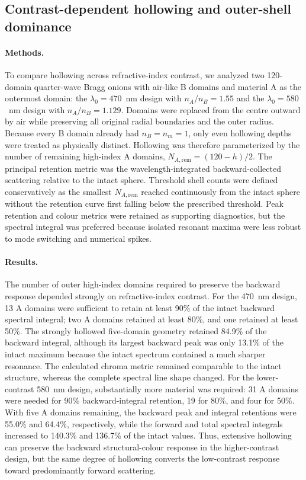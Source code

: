 \subsection{Contrast-dependent hollowing and outer-shell dominance}
\label{sec:hollowing_contrast}

\paragraph{Methods.}
To compare hollowing across refractive-index contrast, we analyzed two 120-domain quarter-wave Bragg onions with air-like B domains and material A as the outermost domain: the $\lambda_0=470$~nm design with $n_A/n_B=1.55$ and the $\lambda_0=580$~nm design with $n_A/n_B=1.129$. Domains were replaced from the centre outward by air while preserving all original radial boundaries and the outer radius. Because every B domain already had $n_B=n_m=1$, only even hollowing depths were treated as physically distinct. Hollowing was therefore parameterized by the number of remaining high-index A domains, $N_{A,\mathrm{rem}}=(120-h)/2$. The principal retention metric was the wavelength-integrated backward-collected scattering relative to the intact sphere. Threshold shell counts were defined conservatively as the smallest $N_{A,\mathrm{rem}}$ reached continuously from the intact sphere without the retention curve first falling below the prescribed threshold. Peak retention and colour metrics were retained as supporting diagnostics, but the spectral integral was preferred because isolated resonant maxima were less robust to mode switching and numerical spikes.

\paragraph{Results.}
The number of outer high-index domains required to preserve the backward response depended strongly on refractive-index contrast. For the 470~nm design, 13 A domains were sufficient to retain at least 90\% of the intact backward spectral integral; two A domains retained at least 80\%, and one retained at least 50\%. The strongly hollowed five-domain geometry retained 84.9\% of the backward integral, although its largest backward peak was only 13.1\% of the intact maximum because the intact spectrum contained a much sharper resonance. The calculated chroma metric remained comparable to the intact structure, whereas the complete spectral line shape changed. For the lower-contrast 580~nm design, substantially more material was required: 31 A domains were needed for 90\% backward-integral retention, 19 for 80\%, and four for 50\%. With five A domains remaining, the backward peak and integral retentions were 55.0\% and 64.4\%, respectively, while the forward and total spectral integrals increased to 140.3\% and 136.7\% of the intact values. Thus, extensive hollowing can preserve the backward structural-colour response in the higher-contrast design, but the same degree of hollowing converts the low-contrast response toward predominantly forward scattering.

